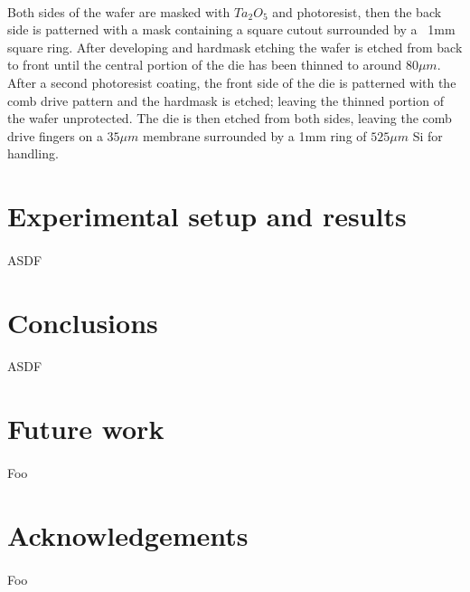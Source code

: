 \documentclass[twocolumn]{article}
\begin{document}
\paragraph*{}
Both sides of the wafer are masked with $Ta_2O_5$ and photoresist, then the back side is patterned
with a mask containing a square cutout surrounded by a ~1mm square ring. After developing and
hardmask etching the wafer is etched from back to front until the central portion of the die has
been thinned to around $80 \mu m$. After a second photoresist coating, the front side of the die is
patterned with the comb drive pattern and the hardmask is etched; leaving the thinned portion of the
wafer unprotected. The die is then etched from both sides, leaving the comb drive fingers on a
$35 \mu m$ membrane surrounded by a 1mm ring of $525 \mu m$ Si for handling.

\section{Experimental setup and results}
\paragraph*{}
ASDF

\section{Conclusions}
\paragraph*{}
ASDF

\section{Future work}
\paragraph*{}
Foo

\section{Acknowledgements}
\paragraph*{}
Foo
\end{document}
